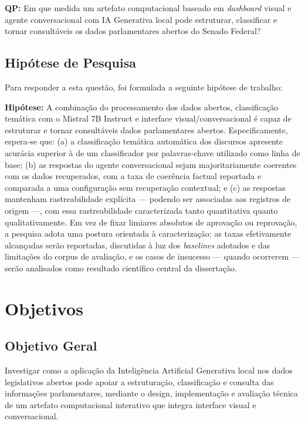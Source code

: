 \begin{citacao}
\textbf{QP:} Em que medida um artefato computacional baseado em \textit{dashboard} visual e agente conversacional com IA Generativa local pode estruturar, classificar e tornar consultáveis os dados parlamentares abertos do Senado Federal?
\end{citacao}

\subsection{Hipótese de Pesquisa}
Para responder a esta questão, foi formulada a seguinte hipótese de trabalho:

\begin{citacao}
\textbf{Hipótese:} A combinação do processamento dos dados abertos, classificação temática com o Mistral 7B Instruct e interface visual/conversacional é capaz de estruturar e tornar consultáveis dados parlamentares abertos. Especificamente, espera-se que: (a) a classificação temática automática dos discursos apresente acurácia superior à de um classificador por palavras-chave utilizado como linha de base; (b) as respostas do agente conversacional sejam majoritariamente coerentes com os dados recuperados, com a taxa de coerência factual reportada e comparada a uma configuração sem recuperação contextual; e (c) as respostas mantenham rastreabilidade explícita --- podendo ser associadas aos registros de origem ---, com essa rastreabilidade caracterizada tanto quantitativa quanto qualitativamente. Em vez de fixar limiares absolutos de aprovação ou reprovação, a pesquisa adota uma postura orientada à caracterização: as taxas efetivamente alcançadas serão reportadas, discutidas à luz dos \textit{baselines} adotados e das limitações do corpus de avaliação, e os casos de insucesso --- quando ocorrerem --- serão analisados como resultado científico central da dissertação.
\end{citacao}

\section{Objetivos}

\subsection{Objetivo Geral}
Investigar como a aplicação da Inteligência Artificial Generativa local nos dados legislativos abertos pode apoiar a estruturação, classificação e consulta das informações parlamentares, mediante o design, implementação e avaliação técnica de um artefato computacional interativo que integra interface visual e conversacional.

